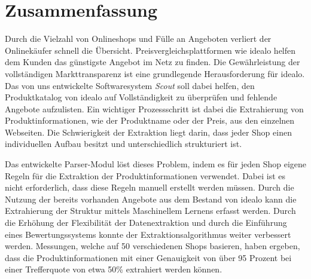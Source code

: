 \section*{Zusammenfassung}
\label{sec:abstract}

Durch die Vielzahl von Onlineshops und Fülle an Angeboten verliert der Onlinekäufer schnell die Übersicht.
Preisvergleichsplattformen wie idealo helfen dem Kunden das günstigste Angebot im Netz zu finden.
Die Gewährleistung der vollständigen Markttransparenz ist eine grundlegende Herausforderung für idealo.
Das von uns entwickelte Softwaresystem \textit{Scout} soll dabei helfen, den Produktkatalog von idealo auf
Vollständigkeit zu überprüfen und fehlende Angebote aufzulisten.
Ein wichtiger Prozessschritt ist dabei die Extrahierung von Produktinformationen, wie der Produktname oder der
Preis, aus den einzelnen Webseiten.
Die Schwierigkeit der Extraktion liegt darin, dass jeder Shop einen individuellen Aufbau besitzt und unterschiedlich
strukturiert ist.

Das entwickelte Parser-Modul löst dieses Problem, indem es für jeden Shop eigene Regeln für die Extraktion der
Produktinformationen verwendet.
Dabei ist es nicht erforderlich, dass diese Regeln manuell erstellt werden müssen.
Durch die Nutzung der bereits vorhanden Angebote aus dem Bestand von idealo kann die Extrahierung der Struktur
mittels Maschinellem Lernens erfasst werden.
Durch die Erhöhung der Flexibilität der Datenextraktion und durch die Einführung eines Bewertungssystems konnte der
Extraktionsalgorithmus weiter verbessert werden.
Messungen, welche auf 50 verschiedenen Shops basieren, haben ergeben, dass die Produktinformationen mit einer
Genauigkeit von über 95 Prozent bei einer Trefferquote von etwa 50\% extrahiert werden können.